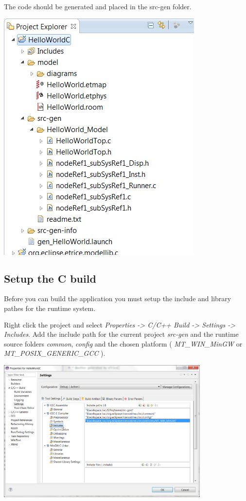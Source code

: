 The code should be generated and placed in the src-gen folder.

\includegraphics{images/016-HelloWorldC13.png}

\subsection{Setup the C build}

Before you can build the application you must setup the include and library pathes for the runtime system. 

Right click the project and select \textit{Properties -> C/C++ Build -> Settings -> Includes}. 
Add the include path for the current project \emph{src-gen} and the runtime source folders \emph{common}, \emph{config} and the chosen platform ( \emph{MT\_WIN\_MinGW} or \emph{MT\_POSIX\_GENERIC\_GCC} ).

\includegraphics[width=0.8\textwidth]{images/016-HelloWorldC14.png}

